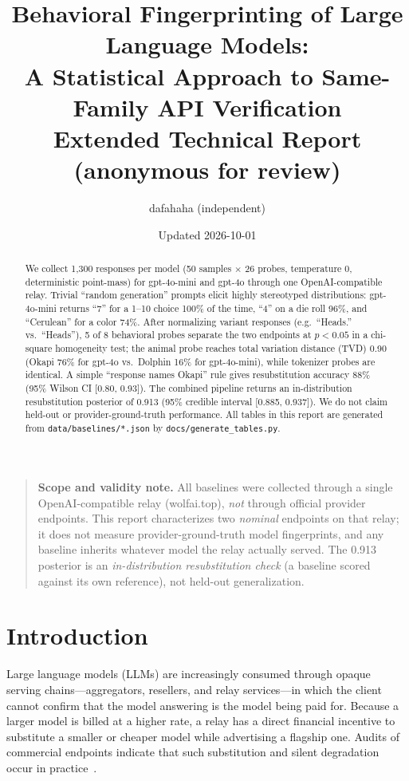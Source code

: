 \documentclass[11pt]{article}
\title{Behavioral Fingerprinting of Large Language Models:\\A Statistical Approach to Same-Family API Verification\\[6pt]
\large Extended Technical Report (anonymous for review)}
\author{dafahaha (independent)}
\date{Updated 2026-10-01}
\begin{document}
\maketitle

\begin{quotation}
\small\noindent\textbf{Scope and validity note.} All baselines were collected through a single OpenAI-compatible relay (wolfai.top), \emph{not} through official provider endpoints. This report characterizes two \emph{nominal} endpoints on that relay; it does not measure provider-ground-truth model fingerprints, and any baseline inherits whatever model the relay actually served. The 0.913 posterior is an \emph{in-distribution resubstitution check} (a baseline scored against its own reference), not held-out generalization.
\end{quotation}

\begin{abstract}
We collect 1{,}300 responses per model (50 samples $\times$ 26 probes, temperature 0, deterministic point-mass) for gpt-4o-mini and gpt-4o through one OpenAI-compatible relay. Trivial ``random generation'' prompts elicit highly stereotyped distributions: gpt-4o-mini returns ``7'' for a 1--10 choice 100\% of the time, ``4'' on a die roll 96\%, and ``Cerulean'' for a color 74\%. After normalizing variant responses (e.g.\ ``Heads.'' vs.\ ``Heads''), 5 of 8 behavioral probes separate the two endpoints at $p<0.05$ in a chi-square homogeneity test; the animal probe reaches total variation distance (TVD) 0.90 (Okapi 76\% for gpt-4o vs.\ Dolphin 16\% for gpt-4o-mini), while tokenizer probes are identical. A simple ``response names Okapi'' rule gives resubstitution accuracy 88\% (95\% Wilson CI [0.80, 0.93]). The combined pipeline returns an in-distribution resubstitution posterior of 0.913 (95\% credible interval [0.885, 0.937]). We do not claim held-out or provider-ground-truth performance. All tables in this report are generated from \texttt{data/baselines/*.json} by \texttt{docs/generate\_tables.py}.
\end{abstract}

\section{Introduction}
\label{sec:intro}

Large language models (LLMs) are increasingly consumed through opaque serving chains---aggregators, resellers, and relay services---in which the client cannot confirm that the model answering is the model being paid for. Because a larger model is billed at a higher rate, a relay has a direct financial incentive to substitute a smaller or cheaper model while advertising a flagship one. Audits of commercial endpoints indicate that such substitution and silent degradation occur in practice~\cite{cai2025pay,met2025}.
\end{document}
